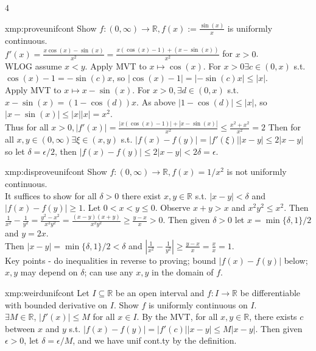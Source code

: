 \documentclass[landscape, 8pt]{extarticle}
\begin{document}
\begin{multicols*}{4}
		
		\begin{xmp}{xmp:proveunifcont}{ }
		Show $f: (0, \infty) \to \mathbb{R}, f(x) := \frac{\sin(x)}{x}$ is uniformly continuous.\\
		$f'(x) = \frac{x\cos(x) - \sin(x)}{x^2} = \frac{x(\cos(x)-1) + (x-\sin(x))}{x^2}$ for $x > 0$.\\
		WLOG assume $x < y$. Apply MVT to $x \mapsto \cos(x)$. For $x > 0 \exists c\in (0, x)$ s.t. $\cos(x) -1 = -\sin(c)x$, so $\left|\cos(x) - 1\right| = \left|-\sin(c)x\right| \le \left|x\right|$.\\
		Apply MVT to $x \mapsto x - \sin(x)$. For $x > 0, \exists d\in (0, x)$ s.t. $x-\sin(x) = (1-\cos(d))x$. As above $\left|1-\cos(d)\right| \le \left|x\right|$, so $\left|x-\sin(x)\right| \le \left|x\right| \left|x\right| = x^2$.\\
		Thus for all $x > 0, \left|f'(x)\right| = \frac{\left|x(\cos(x)-1)\right| + \left|x-\sin(x)\right|}{x^2} \le \frac{x^2 + x^2}{x^2} = 2$
		Then for all $x, y\in (0, \infty) \exists \xi\in (x, y)$ s.t. $\left|f(x) - f(y)\right| = \left|f'(\xi)\right| \left|x-y\right| \le 2\left|x-y\right|$ so let $\delta =\epsilon/2$, then $\left|f(x) - f(y)\right| \le 2\left|x-y\right| < 2 \delta =\epsilon$.
		
		\end{xmp}
		
		
		\begin{xmp}{xmp:disproveunifcont}{ }
		Show $f: (0, \infty) \to \mathbb{R}, f(x) = 1/x^2$ is not uniformly continuous.\\
		It suffices to show for all $\delta > 0$ there exist $x, y\in \mathbb{R}$ s.t. $\left|x-y\right| < \delta$ and $\left|f(x) - f(y)\right| \ge 1$. Let $0 < x < y \le 0$. Observe $x + y > x$ and $x^2 y^2 \le x^2$. Then $\frac{1}{x^2} - \frac{1}{y^2} = \frac{y^2 - x^2}{x^2y^2} = \frac{(x-y)(x+y)}{x^2y^2} \ge \frac{y-x}{x} > 0$. Then given $\delta >0$ let $x = \min\{\delta, 1\}/2$ and $y=2x$. \\
		Then $\left|x-y\right| = \min\{\delta, 1\}/2 < \delta$ and $\left|\frac{1}{x^2} - \frac{1}{y^2}\right| \ge \frac{y-x}{x} = \frac{x}{x} = 1$.\\
		Key points - do inequalities in reverse to proving; bound $\left|f(x) - f(y)\right|$ below; $x, y$ may depend on $\delta$; can use any $x, y$ in the domain of $f$.
		
		\end{xmp}
		
		
		\begin{xmp-s}{xmp:weirdunifcont}{ }
			Let $I \subseteq \mathbb{R}$ be an open interval and $f: I \to \mathbb{R}$ be differentiable with bounded derivative on $I$. Show $f$ is uniformly continuous on $I$.\\
			$\exists M\in \mathbb{R}$, $\left|f'(x)\right| \le M$ for all $x\in I$. By the MVT, for all $x, y\in \mathbb{R}$, there exists $c$ between $x$ and $y$ s.t. $\left|f(x) - f(y)\right| = \left|f'(c)\right| \left|x-y\right| \le M\left|x-y\right|$. Then given $\epsilon > 0$, let $\delta =\epsilon/M$, and we have unif cont.ty by the definition.
			

\end{xmp-s}
\end{multicols*}
\end{document}
